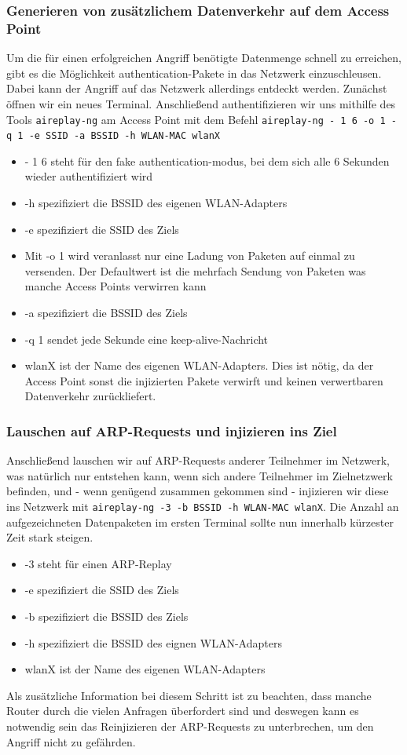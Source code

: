 	\subsubsection{Generieren von zusätzlichem Datenverkehr auf dem Access Point}
	Um die für einen erfolgreichen Angriff benötigte Datenmenge schnell zu erreichen, gibt es die
	Möglichkeit authentication-Pakete in das Netzwerk einzuschleusen. Dabei kann der Angriff auf das
	Netzwerk allerdings entdeckt werden. Zunächst öffnen wir ein neues Terminal. Anschließend authentifizieren wir uns mithilfe des Tools \colorbox{altgray}{\lstinline|aireplay-ng|} am Access Point mit dem Befehl \colorbox{altgray}{\lstinline|aireplay-ng - 1 6 -o 1 -q 1 -e SSID -a BSSID -h WLAN-MAC wlanX|}
			\begin{itemize}
				\item - 1 6 steht für den fake authentication-modus, bei dem sich alle 6 Sekunden wieder authentifiziert wird
				\item -h spezifiziert die BSSID des eigenen WLAN-Adapters
				\item -e spezifiziert die SSID des Ziels
				\item Mit -o 1 wird veranlasst nur eine Ladung von Paketen auf einmal zu versenden. Der Defaultwert ist die mehrfach Sendung von Paketen was manche Access Points verwirren kann
				\item -a spezifiziert die BSSID des Ziels
				\item -q 1 sendet jede Sekunde eine keep-alive-Nachricht
				\item wlanX ist der Name des eigenen WLAN-Adapters. Dies ist nötig, da der Access Point sonst die injizierten Pakete verwirft und keinen verwertbaren Datenverkehr zurückliefert.
			\end{itemize}

	\subsubsection{Lauschen auf ARP-Requests und injizieren ins Ziel}
	Anschließend lauschen wir auf ARP-Requests anderer Teilnehmer im Netzwerk, was natürlich nur entstehen kann, wenn sich andere Teilnehmer im Zielnetzwerk befinden, und - wenn
	genügend zusammen gekommen sind - injizieren wir diese ins Netzwerk mit \colorbox{altgray}{\lstinline|aireplay-ng -3 -b BSSID -h WLAN-MAC wlanX|}.
	Die Anzahl an aufgezeichneten Datenpaketen im ersten Terminal sollte nun innerhalb
	kürzester Zeit stark steigen.
			\begin{itemize}
				\item -3 steht für einen ARP-Replay
				\item -e spezifiziert die SSID des Ziels
				\item -b spezifiziert die BSSID des Ziels
				\item -h spezifiziert die BSSID des eignen WLAN-Adapters
				\item wlanX ist der Name des eigenen WLAN-Adapters
			\end{itemize}
	Als zusätzliche Information bei diesem Schritt ist zu beachten, dass manche Router durch die vielen Anfragen überfordert sind und deswegen kann es notwendig sein das Reinjizieren der ARP-Requests zu unterbrechen, um den Angriff nicht zu gefährden.

